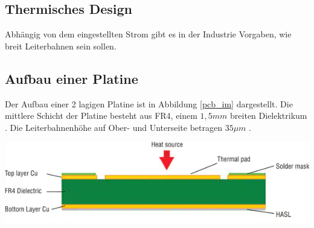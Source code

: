 \documentclass[10pt,a4paper,oneside,abstracton]{scrartcl}
\newenvironment{Figure}
  {\par\medskip\noindent\minipage{\linewidth}}
  {\endminipage\par\medskip}
\begin{document}
\begin{multicols}{2}


\section{Thermisches Design}
Abhängig von dem eingestellten Strom gibt es in der Industrie Vorgaben, 
wie breit Leiterbahnen sein sollen. \newline

\subsection{Aufbau einer Platine}
Der Aufbau einer 2 lagigen Platine ist in Abbildung \ref*{pcb_im} dargestellt. 
\newline
Die mittlere Schicht der Platine besteht aus FR4, einem $ 1,5mm $ breiten Dielektrikum \cite{PCB_Querschnitt}. 
Die Leiterbahnenhöhe auf Ober- und Unterseite betragen $ 35 \mu m$ \cite{aisler}.
\begin{Figure}
	\includegraphics[width=\textwidth]{Bilder/PCB_Querschnitt.png}
	\label{pcb_im}
\end{Figure}


\end{multicols}
\end{document}
